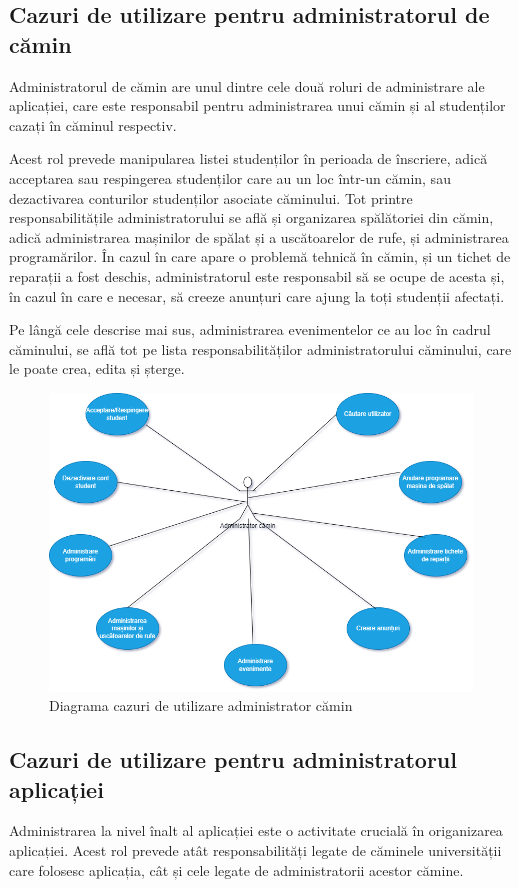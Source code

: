 \documentclass[12pt,a4paper]{report}
\theoremstyle{definition}
\theoremstyle{remark}
\begin{document}
\subsection{Cazuri de utilizare pentru administratorul de cămin}
\par Administratorul de cămin are unul dintre cele două roluri de administrare ale aplicației, care este responsabil pentru administrarea unui cămin și al studenților cazați în căminul respectiv.

\par Acest rol prevede manipularea listei studenților în perioada de înscriere, adică acceptarea sau respingerea studenților care au un loc într-un cămin, sau dezactivarea conturilor studenților asociate căminului. Tot printre responsabilitățile administratorului se află și organizarea spălătoriei din cămin, adică administrarea mașinilor de spălat și a uscătoarelor de rufe, și administrarea programărilor. În cazul în care apare o problemă tehnică în cămin, și un tichet de reparații a fost deschis, administratorul este responsabil să se ocupe de acesta și, în cazul în care e necesar, să creeze anunțuri care ajung la toți studenții afectați.

\par Pe lângă cele descrise mai sus, administrarea evenimentelor ce au loc în cadrul căminului, se află tot pe lista responsabilităților administratorului căminului, care le poate crea, edita și șterge.

\begin{figure}[H]
    \centering
    \includegraphics[width=0.75\linewidth]{resurse/diagrame/Usecase_administrator_camin.drawio.png}
    \caption{Diagrama cazuri de utilizare administrator cămin}
\end{figure}

\subsection{Cazuri de utilizare pentru administratorul aplicației}
\par Administrarea la nivel înalt al aplicației este o activitate crucială în origanizarea aplicației. Acest rol prevede atât responsabilități legate de căminele universității care folosesc aplicația, cât și cele legate de administratorii acestor cămine.
\end{document}
